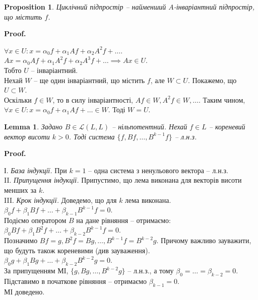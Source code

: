 \documentclass[a4paper, 10pt]{article}
\makeatletter
\theoremstyle{theoremdd}
\newtheorem{proposition}[theorem]{Proposition}
\newtheorem{lemma}[theorem]{Lemma}
\renewenvironment{proof}[1][Proof.\\]{\par
\pushQED{\hfill \qed}%
\normalfont \topsep6\p@\@plus6\p@\relax
\trivlist
\item\relax
{\bfseries
#1\@addpunct{.}}\hspace\labelsep\ignorespaces
}{%
\popQED\endtrivlist\@endpefalse
}
\makeatother
\begin{document}
\begin{proposition}
Циклічний підпростір -- найменший $A$-інваріантний підпростір, що містить $f$.
\end{proposition}

\begin{proof}
$\forall x \in U: x = \alpha_0 f + \alpha_1 Af + \alpha_2 A^2 f + \dots$.\\
$Ax = \alpha_0 Af + \alpha_1 A^2f + \alpha_2 A^3 f + \dots \implies Ax \in U$.\\
Тобто $U$ -- інваріантний.\\
Нехай $W$ -- ще один інваріантний, що містить $f$, але $W \subset U$. Покажемо, що $U \subset W$.\\
Оскільки $f \in W$, то в силу інваріантності, $Af \in W, A^2f \in W, \dots$. Таким чином,\\
$\forall x \in U: x = \alpha_0 f + \alpha_1 Af + \dots \in W$. Тоді $W = U$.
\end{proof}

\begin{lemma}
Задано $B \in \mathcal{L}(L,L)$ -- нільпотентний. Нехай $f \in L$ -- кореневий вектор висоти $k>0$. Тоді система $\{f,Bf,\dots,B^{k-1}f\}$ -- л.н.з.
\end{lemma}

\begin{proof}
І. \textit{База індукції.} При $k = 1$ -- одна система з ненульового вектора -- л.н.з.\\
II. \textit{Припущення індукції.} Припустимо, що лема виконана для векторів висоти менших за $k$. \\
III. \textit{Крок індукції.} Доведемо, що для $k$ лема виконана.\\
$\beta_0 f + \beta_1 Bf + \dots + \beta_{k-1}B^{k-1}f = 0$.\\
Подіємо оператором $B$ на дане рівняння -- отримаємо:\\
$\beta_0 Bf + \beta_1 B^2f + \dots + \beta_{k-2}B^{k-1}f = 0$.\\
Позначимо $Bf = g, B^2f = Bg, \dots, B^{k-1}f = B^{k-2}g$. Причому важливо зауважити, що будуть також кореневими (див зауваження).\\
$\beta_0 g + \beta_1 Bg + \dots + \beta_{k-2} B^{k-2}g = 0$.\\
За припущенням МІ, $\{g,Bg,\dots,B^{k-2}g\}$ -- л.н.з., а тому $\beta_0 = \dots = \beta_{k-2} = 0$.\\
Підставимо в початкове рівняння -- отримаємо $\beta_{k-1} = 0$.\\
МІ доведено.
\end{proof}
\end{document}

